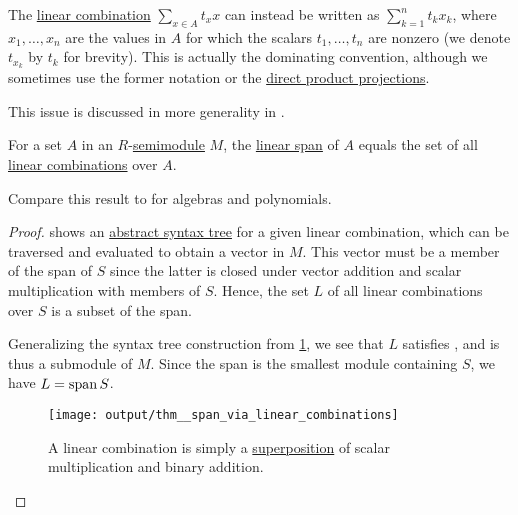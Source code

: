 \begin{remark}\label{rem:linear_combinations}
  The \hyperref[def:free_semimodule]{linear combination} \( \sum_{x \in A} t_x x \) can instead be written as \( \sum_{k=1}^n t_k x_k \), where \( x_1, \ldots, x_n \) are the values in \( A \) for which the scalars \( t_1, \ldots, t_n \) are nonzero (we denote \( t_{x_k} \) by \( t_k \) for brevity). This is actually the dominating convention, although we sometimes use the former notation or the \hyperref[thm:direct_product_projections]{direct product projections}.

  This issue is discussed in more generality in .
\end{remark}

\begin{proposition}\label{thm:span_via_linear_combinations}
  For a set \( A \) in an \( R \)-\hyperref[def:semimodule]{semimodule} \( M \), the \hyperref[def:semimodule/generated]{linear span} of \( A \) equals the set of all \hyperref[rem:linear_combinations]{linear combinations} over \( A \).
\end{proposition}
\begin{comments}
  \item Compare this result to  for algebras and polynomials.
\end{comments}
\begin{proof}
   shows an \hyperref[rem:abstract_syntax_tree]{abstract syntax tree} for a given linear combination, which can be traversed and evaluated to obtain a vector in \( M \). This vector must be a member of the span of \( S \) since the latter is closed under vector addition and scalar multiplication with members of \( S \). Hence, the set \( L \) of all linear combinations over \( S \) is a subset of the span.

  Generalizing the syntax tree construction from \cref{fig:thm:span_via_linear_combinations}, we see that \( L \) satisfies , and is thus a submodule of \( M \). Since the span is the smallest module containing \( S \), we have \( L = \operatorname{span} S \).

  \begin{figure}[!ht]
    \hfill
    \texttt{[image: output/thm\_\_span\_via\_linear\_combinations]}
    \hfill\hfill
    \caption{A linear combination is simply a \hyperref[rem:function_superposition]{superposition} of scalar multiplication and binary addition.}
    \label{fig:thm:span_via_linear_combinations}
  \end{figure}
\end{proof}

